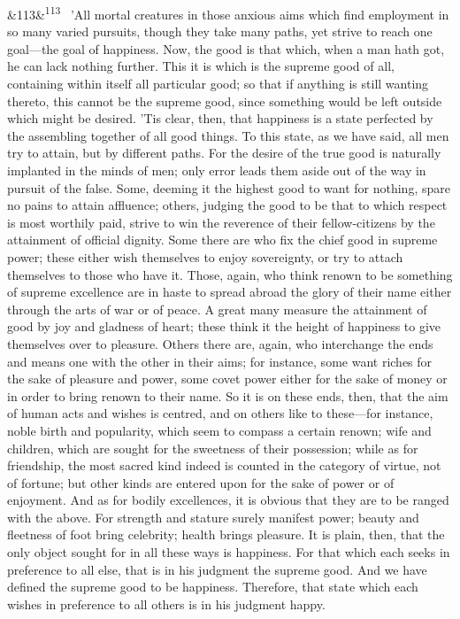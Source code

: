 \documentclass[12pt]{article}
\newcommand{\para}[1][]{\par\noindent\ifx&#1&\else\textsuperscript{\footnotesize #1}~\fi}
\begin{document}
\para[113] 'All mortal creatures in those anxious aims which find employment in so many varied pursuits, though they take many paths, yet strive to reach one goal---the goal of happiness. Now, the good is that which, when a man hath got, he can lack nothing further. This it is which is the supreme good of all, containing within itself all particular good; so that if anything is still wanting thereto, this cannot be the supreme good, since something would be left outside which might be desired. 'Tis clear, then, that happiness is a state perfected by the assembling together of all good things. To this state, as we have said, all men try to attain, but by different paths. For the desire of the true good is naturally implanted in the minds of men; only error leads them aside out of the way in pursuit of the false. Some, deeming it the highest good to want for nothing, spare no pains to attain affluence; others, judging the good to be that to which respect is most worthily paid, strive to win the reverence of their fellow-citizens by the attainment of official dignity. Some there are who fix the chief good in supreme power; these either wish themselves to enjoy sovereignty, or try to attach themselves to those who have it. Those, again, who think renown to be something of supreme excellence are in haste to spread abroad the glory of their name either through the arts of war or of peace. A great many measure the attainment of good by joy and gladness of heart; these think it the height of happiness to give themselves over to pleasure. Others there are, again, who interchange the ends and means one with the other in their aims; for instance, some want riches for the sake of pleasure and power, some covet power either for the sake of money or in order to bring renown to their name. So it is on these ends, then, that the aim of human acts and wishes is centred, and on others like to these---for instance, noble birth and popularity, which seem to compass a certain renown; wife and children, which are sought for the sweetness of their possession; while as for friendship, the most sacred kind indeed is counted in the category of virtue, not of fortune; but other kinds are entered upon for the sake of power or of enjoyment. And as for bodily excellences, it is obvious that they are to be ranged with the above. For strength and stature surely manifest power; beauty and fleetness of foot bring celebrity; health brings pleasure. It is plain, then, that the only object sought for in all these ways is happiness. For that which each seeks in preference to all else, that is in his judgment the supreme good. And we have defined the supreme good to be happiness. Therefore, that state which each wishes in preference to all others is in his judgment happy.
\end{document}
